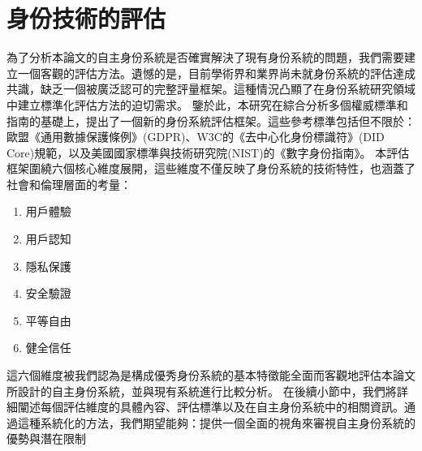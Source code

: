 \section{身份技術的評估}
為了分析本論文的自主身份系統是否確實解決了現有身份系統的問題，我們需要建立一個客觀的評估方法。遺憾的是，目前學術界和業界尚未就身份系統的評估達成共識，缺乏一個被廣泛認可的完整評量框架。這種情況凸顯了在身份系統研究領域中建立標準化評估方法的迫切需求。\newline
鑒於此，本研究在綜合分析多個權威標準和指南的基礎上，提出了一個新的身份系統評估框架。這些參考標準包括但不限於：歐盟《通用數據保護條例》(GDPR)\cite{GDPR2016}、W3C的《去中心化身份標識符》(DID Core)規範\cite{DIDCore}，以及美國國家標準與技術研究院(NIST)的《數字身份指南》\cite{NIST800-63-3}。\newline
本評估框架圍繞六個核心維度展開，這些維度不僅反映了身份系統的技術特性，也涵蓋了社會和倫理層面的考量：
\begin{enumerate}
  \item 用戶體驗
  \item 用戶認知
  \item 隱私保護
  \item 安全驗證
  \item 平等自由
  \item 健全信任
\end{enumerate}
這六個維度被我們認為是構成優秀身份系統的基本特徵能全面而客觀地評估本論文所設計的自主身份系統，並與現有系統進行比較分析。\newline
在後續小節中，我們將詳細闡述每個評估維度的具體內容、評估標準以及在自主身份系統中的相關資訊。通過這種系統化的方法，我們期望能夠：提供一個全面的視角來審視自主身份系統的優勢與潛在限制
